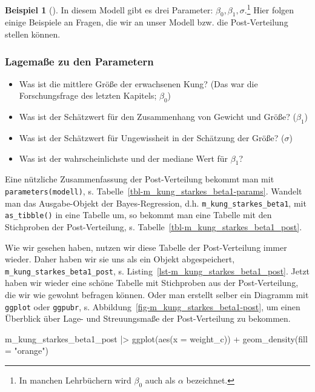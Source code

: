 \documentclass[
  ngerman,
  letterpaper,
  twoside,
  open=any]{scrbook}
\newenvironment{Shaded}{\begin{snugshade}}{\end{snugshade}}
\newcommand{\AttributeTok}[1]{\textcolor[rgb]{0.40,0.45,0.13}{#1}}
\newcommand{\FunctionTok}[1]{\textcolor[rgb]{0.28,0.35,0.67}{#1}}
\newcommand{\NormalTok}[1]{\textcolor[rgb]{0.00,0.23,0.31}{#1}}
\newcommand{\SpecialCharTok}[1]{\textcolor[rgb]{0.37,0.37,0.37}{#1}}
\newcommand{\StringTok}[1]{\textcolor[rgb]{0.13,0.47,0.30}{#1}}
\providecommand{\tightlist}{%
  \setlength{\itemsep}{0pt}\setlength{\parskip}{0pt}}\usepackage{longtable,booktabs,array}
\theoremstyle{definition}
\newtheorem{example}{Beispiel}[chapter]
\theoremstyle{plain}
\theoremstyle{definition}
\theoremstyle{definition}
\theoremstyle{remark}
\begin{document}
\begin{example}[]
In diesem Modell gibt es drei Parameter:
\(\beta_0, \beta_1, \sigma\).\footnote{In manchen Lehrbüchern wird
  \(\beta_0\) auch als \(\alpha\) bezeichnet.} Hier folgen einige
Beispiele an Fragen, die wir an unser Modell bzw. die Post-Verteilung
stellen können.

\subsubsection{Lagemaße zu den
Parametern}\label{lagemauxdfe-zu-den-parametern}

\begin{itemize}
\tightlist
\item
  Was ist die mittlere Größe der erwachsenen Kung? (Das war die
  Forschungsfrage des letzten Kapitels; \(\beta_0\))
\item
  Was ist der Schätzwert für den Zusammenhang von Gewicht und Größe?
  (\(\beta_1\))
\item
  Was ist der Schätzwert für Ungewissheit in der Schätzung der Größe?
  (\(\sigma\))
\item
  Was ist der wahrscheinlichste und der mediane Wert für \(\beta_1\)?
\end{itemize}

Eine nützliche Zusammenfassung der Post-Verteilung bekommt man mit
\texttt{parameters(modell)}, s.
Tabelle~\ref{tbl-m_kung_starkes_beta1-params}. Wandelt man das
Ausgabe-Objekt der Bayes-Regression, d.h.
\texttt{m\_kung\_starkes\_beta1}, mit \texttt{as\_tibble()} in eine
Tabelle um, so bekommt man eine Tabelle mit den Stichproben der
Post-Verteilung, s. Tabelle~\ref{tbl-m_kung_starkes_beta1_post}.

Wie wir gesehen haben, nutzen wir diese Tabelle der Post-Verteilung
immer wieder. Daher haben wir sie uns als ein Objekt abgespeichert,
\texttt{m\_kung\_starkes\_beta1\_post}, s.
Listing~\ref{lst-m_kung_starkes_beta1_post}. Jetzt haben wir wieder eine
schöne Tabelle mit Stichproben aus der Post-Verteilung, die wir wie
gewohnt befragen können. Oder man erstellt selber ein Diagramm mit
\texttt{ggplot} oder \texttt{ggpubr}, s.
Abbildung~\ref{fig-m_kung_starkes_beta1-post}, um einen Überblick über
Lage- und Streuungsmaße der Post-Verteilung zu bekommen.

\begin{Shaded}
\begin{Highlighting}[]
\NormalTok{m\_kung\_starkes\_beta1\_post }\SpecialCharTok{|\textgreater{}} 
  \FunctionTok{ggplot}\NormalTok{(}\FunctionTok{aes}\NormalTok{(}\AttributeTok{x =}\NormalTok{ weight\_c)) }\SpecialCharTok{+}
  \FunctionTok{geom\_density}\NormalTok{(}\AttributeTok{fill =} \StringTok{"orange"}\NormalTok{)}
\end{Highlighting}
\end{Shaded}


\end{example}
\end{document}
